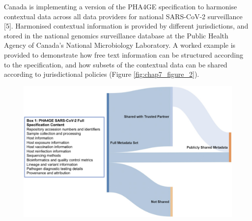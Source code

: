 Canada is implementing a version of the PHA4GE specification to harmonise contextual data across all data providers for national SARS-CoV-2 surveillance [5]. Harmonised contextual information is provided by different jurisdictions, and stored in the national genomics surveillance database at the Public Health Agency of Canada’s National Microbiology Laboratory. A worked example is provided to demonstrate how free text information can be structured according to the specification, and how subsets of the contextual data can be shared according to jurisdictional policies (Figure \ref{fig:chap7_figure_2}). 

\begin{figure}[h!]
\centering
\includegraphics[width=\textwidth]{figures/chapter 7/giac003fig1.jpeg}

\end{figure}
